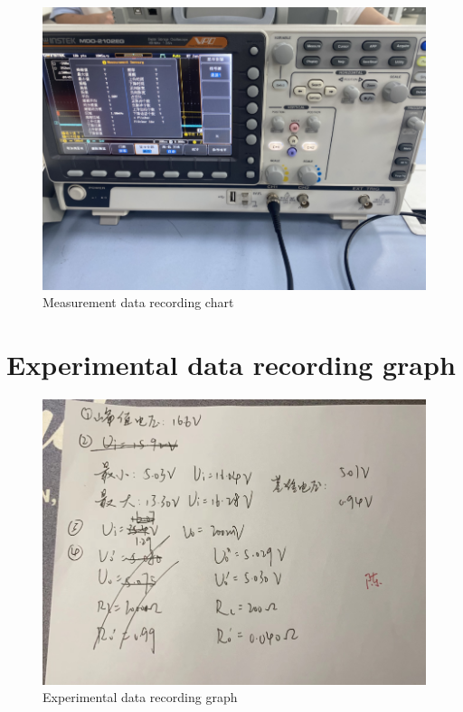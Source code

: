 \documentclass[UTF8]{article}
\begin{document}
\begin{appendix}
    	\begin{figure}[H]
    	    	\centering
    	    	\includegraphics[clip,scale=0.8,trim={0 0 0 0}]{fig/fig18.png}
    	        \caption{Measurement data recording chart}
    	        \label{figure.18}
        \end{figure} 
        
 \section{Experimental data recording graph} 
     	\begin{figure}[H]
     	    	\centering
     	    	\includegraphics[clip,scale=1,trim={0 0 0 0}]{fig/fig23.png}
     	        \caption{Experimental data recording graph}
     	        \label{figure.19}
         \end{figure} 
 \end{appendix}        
\end{document}
